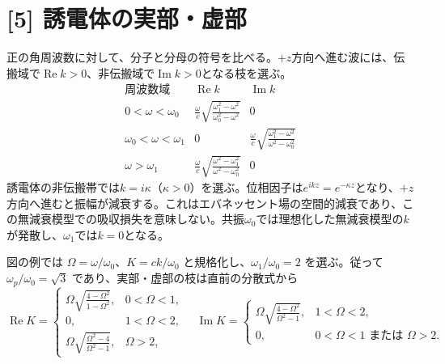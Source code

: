 \documentclass[11pt,a4paper]{article}
\begin{document}
\section*{[5] 誘電体の実部・虚部}
正の角周波数に対して、分子と分母の符号を比べる。$+z$方向へ進む波には、伝搬域で$\operatorname{Re}k>0$、非伝搬域で$\operatorname{Im}k>0$となる枝を選ぶ。
\begin{equation}
  \begin{array}{c|c|c}
    \text{周波数域}&\operatorname{Re}k&\operatorname{Im}k\\ \hline
    0<\omega<\omega_0&
    \displaystyle\frac{\omega}{c}\sqrt{\frac{\omega_1^2-\omega^2}{\omega_0^2-\omega^2}}&0\\[1.1em]
    \omega_0<\omega<\omega_1&0&
    \displaystyle\frac{\omega}{c}\sqrt{\frac{\omega_1^2-\omega^2}{\omega^2-\omega_0^2}}\\[1.1em]
    \omega>\omega_1&
    \displaystyle\frac{\omega}{c}\sqrt{\frac{\omega^2-\omega_1^2}{\omega^2-\omega_0^2}}&0
  \end{array}
\end{equation}
誘電体の非伝搬帯では$k=i\kappa$（$\kappa>0$）を選ぶ。位相因子は$e^{ikz}=e^{-\kappa z}$となり、$+z$方向へ進むと振幅が減衰する。これはエバネッセント場の空間的減衰であり、この無減衰模型での吸収損失を意味しない。共振$\omega_0$では理想化した無減衰模型の$k$が発散し、$\omega_1$では$k=0$となる。

図の例では $\Omega=\omega/\omega_0$、$K=ck/\omega_0$ と規格化し、$\omega_1/\omega_0=2$ を選ぶ。従って $\omega_p/\omega_0=\sqrt{3}$ であり、実部・虚部の枝は直前の分散式から
\begin{equation}
 \operatorname{Re}K=\begin{cases}
 \displaystyle\Omega\sqrt{\frac{4-\Omega^2}{1-\Omega^2}},&0<\Omega<1,\\
 0,&1<\Omega<2,\\
 \displaystyle\Omega\sqrt{\frac{\Omega^2-4}{\Omega^2-1}},&\Omega>2,
 \end{cases}\quad
 \operatorname{Im}K=\begin{cases}
 \displaystyle\Omega\sqrt{\frac{4-\Omega^2}{\Omega^2-1}},&1<\Omega<2,\\
 0,&0<\Omega<1\text{ または }\Omega>2.
 \end{cases}
\end{equation}
\end{document}
